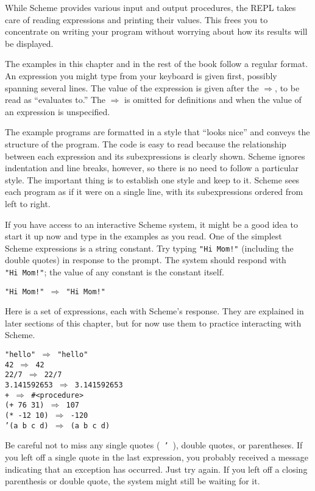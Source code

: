 While Scheme provides various input and output procedures, the REPL
takes care of reading expressions and printing their values.
This frees you to concentrate on writing your program without worrying 
about how its results will be displayed.


The examples in this chapter and in the rest of the book follow a
regular format.
An expression you might type from your keyboard is given first,
possibly spanning several lines.
The value of the expression is given
after the \(\Rightarrow\), to be read as ``evaluates to.''
The \(\Rightarrow\) is omitted for definitions and when the value of
an expression is unspecified.


The example programs are formatted in a style that ``looks nice''
and conveys the structure of the program.
The code is easy to read because the relationship between each
expression and its subexpressions is clearly shown.
Scheme ignores indentation and line breaks, however, so there is no
need to follow a particular style.
The important thing is to establish one style and keep to it.
Scheme sees each program as if it were on a single line, with its
subexpressions ordered from left to right.


If you have access to an interactive Scheme system, it might be a good idea to
start it up now and type in the examples as you read.
One of the simplest Scheme expressions is a \label{start_s1}string constant.
Try typing \texttt{"Hi Mom!"} (including the double quotes) in response
to the prompt.
The system should respond with \texttt{"Hi Mom!"}; the value of any
constant is the constant itself.


\texttt{"Hi Mom!" \(\Rightarrow\) "Hi Mom!"}

Here is a set of expressions, each with Scheme's response.
They are explained in later sections of this chapter, but for now
use them to practice interacting with Scheme.


\begin{alltt}
"hello" \(\Rightarrow\) "hello"
42 \(\Rightarrow\) 42
22/7 \(\Rightarrow\) 22/7
3.141592653 \(\Rightarrow\) 3.141592653
+ \(\Rightarrow\) \#{}\textless{}procedure\textgreater{}
(+ 76 31) \(\Rightarrow\) 107
(* -12 10) \(\Rightarrow\) -120
'(a b c d) \(\Rightarrow\) (a b c d)
\end{alltt}


Be careful not to miss any single quotes ( \texttt{'} ), double quotes, or
parentheses.
If you left off a single quote in the last
expression, you probably received a message indicating that an exception
has occurred.
Just try again.
If you left off a closing parenthesis or double quote, the system might
still be waiting for it.


